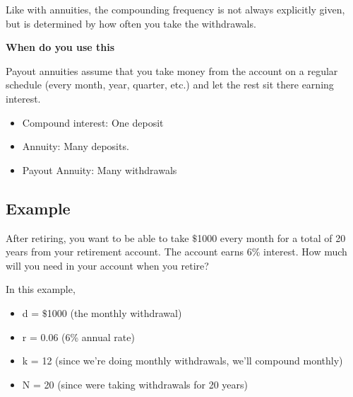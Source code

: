 Like with annuities, the compounding frequency is not always explicitly given, but is
determined by how often you take the withdrawals.



\textbf{When do you use this}

Payout annuities assume that you take money from the account on a regular schedule (every
month, year, quarter, etc.) and let the rest sit there earning interest.

\begin{itemize}
    \item Compound interest: One deposit
    \item Annuity: Many deposits.
    \item Payout Annuity: Many withdrawals
\end{itemize}


\subsection{Example}
\label{sss:exam-1a79}




After retiring, you want to be able to take $\text{\$}$1000 every month for a total of 20
years from your retirement account. The account earns 6\% interest. How much will you need
in your account when you retire?







In this example,

\begin{itemize}
    \item d = $\text{\$}$1000 (the monthly withdrawal)
\end{itemize}

\begin{itemize}
    \item r = 0.06 (6\% annual rate)
\end{itemize}

\begin{itemize}
    \item k = 12 (since we're doing monthly withdrawals, we'll compound monthly)
\end{itemize}

\begin{itemize}
    \item N = 20 (since were taking withdrawals for 20 years)
\end{itemize}

